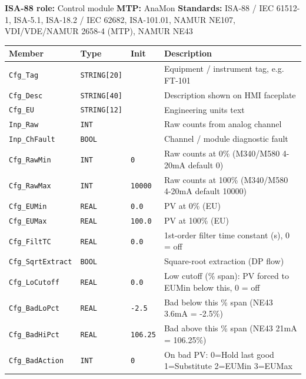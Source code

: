{\small\textbf{ISA-88 role:} Control module \quad \textbf{MTP:} AnaMon \quad \textbf{Standards:} ISA-88 /\allowbreak{} IEC 61512-1, ISA-5.1, ISA-18.2 /\allowbreak{} IEC 62682, ISA-101.01, NAMUR NE107, VDI/\allowbreak{}VDE/\allowbreak{}NAMUR 2658-4 (MTP), NAMUR NE43}
{\footnotesize
\begin{longtable}{@{}>{\raggedright\arraybackslash}p{3.4cm}>{\raggedright\arraybackslash}p{3.3cm}>{\raggedright\arraybackslash}p{1.3cm}>{\raggedright\arraybackslash}p{6.4cm}@{}}
\toprule
\rowcolor{tblhead}\textbf{Member} & \textbf{Type} & \textbf{Init} & \textbf{Description} \\
\midrule
\endhead
\texttt{Cfg\_Tag} & \texttt{STRING[20]} &  & Equipment /\allowbreak{} instrument tag, e.g. FT-101 \\
\texttt{Cfg\_Desc} & \texttt{STRING[40]} &  & Description shown on HMI faceplate \\
\texttt{Cfg\_EU} & \texttt{STRING[12]} &  & Engineering units text \\
\texttt{Inp\_Raw} & \texttt{INT} &  & Raw counts from analog channel \\
\texttt{Inp\_ChFault} & \texttt{BOOL} &  & Channel /\allowbreak{} module diagnostic fault \\
\texttt{Cfg\_RawMin} & \texttt{INT} & \texttt{0} & Raw counts at 0\% (M340/\allowbreak{}M580 4-20mA default 0) \\
\texttt{Cfg\_RawMax} & \texttt{INT} & \texttt{10000} & Raw counts at 100\% (M340/\allowbreak{}M580 4-20mA default 10000) \\
\texttt{Cfg\_EUMin} & \texttt{REAL} & \texttt{0.0} & PV at 0\% (EU) \\
\texttt{Cfg\_EUMax} & \texttt{REAL} & \texttt{100.0} & PV at 100\% (EU) \\
\texttt{Cfg\_FiltTC} & \texttt{REAL} & \texttt{0.0} & 1st-order filter time constant (s), 0 = off \\
\texttt{Cfg\_SqrtExtract} & \texttt{BOOL} &  & Square-root extraction (DP flow) \\
\texttt{Cfg\_LoCutoff} & \texttt{REAL} & \texttt{0.0} & Low cutoff (\% span): PV forced to EUMin below this, 0 = off \\
\texttt{Cfg\_BadLoPct} & \texttt{REAL} & \texttt{-2.5} & Bad below this \% span (NE43 3.6mA = -2.5\%) \\
\texttt{Cfg\_BadHiPct} & \texttt{REAL} & \texttt{106.25} & Bad above this \% span (NE43 21mA = 106.25\%) \\
\texttt{Cfg\_BadAction} & \texttt{INT} & \texttt{0} & On bad PV: 0=Hold last good 1=Substitute 2=EUMin 3=EUMax \\

\end{longtable}}
